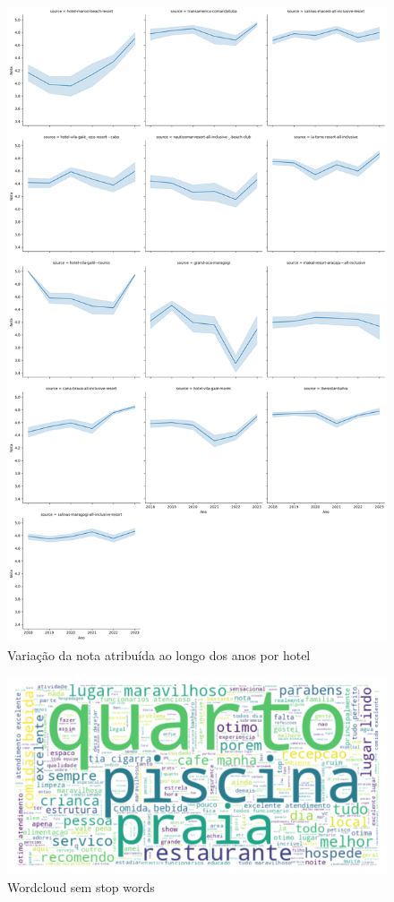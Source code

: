 \begin{figure}
	\centering
	\includegraphics[width=1\textwidth]{figs/exploratoria/relplot_ano_rating_source.png}
	\caption{Variação da nota atribuída ao longo dos anos por hotel}
	\label{img:relplot_ano_rating_source}
\end{figure}


\begin{figure}
	\centering
	\includegraphics[width=1\textwidth]{figs/exploratoria/wordcloud_geral.png}
	\caption{Wordcloud sem stop words}
	\label{img:wordcloud_geral}
\end{figure}


